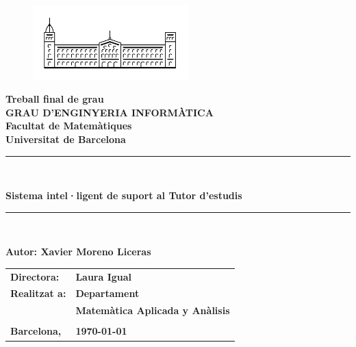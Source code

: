 \documentclass[11pt,a4paper,catalan]{article}
\newcommand{\titleTFG}{Sistema intel·ligent de suport al Tutor d'estudis}
\newcommand{\myname}{Xavier Moreno Liceras}
\begin{document}
\thispagestyle{empty}

\begin{titlepage}
\begin{center}
\begin{figure}[h]
\begin{center}
\includegraphics[width=6cm]{img/ub.png}
\end{center}
\end{figure}

\textbf{\LARGE Treball final de grau} \\
\vspace*{.5cm}
\textbf{\LARGE GRAU D'ENGINYERIA INFORMÀTICA } \\
\vspace*{.5cm}
\textbf{\LARGE Facultat de Matemàtiques \\ Universitat de Barcelona} \\
\vspace*{1.5cm}
\rule{\textwidth}{0.1mm}\\
\begin{Huge}
\textbf{\titleTFG} \\
\end{Huge}
\rule{\textwidth}{0.1mm}\\

\vspace{1cm}

\begin{flushright}
\textbf{\LARGE Autor: \myname}

\vspace*{2cm}

\renewcommand{\arraystretch}{1.5}
\begin{tabular}{ll}
\textbf{\Large Directora:} & \textbf{\Large Laura Igual } \\
\textbf{\Large Realitzat a:} & \textbf{\Large  Departament   } \\
 & \textbf{\Large Matemàtica Aplicada y Anàlisis} \\
\\
\textbf{\Large Barcelona,} & \textbf{\Large \today }
\end{tabular}

\end{flushright}

\end{center}
\end{titlepage}
\end{document}
